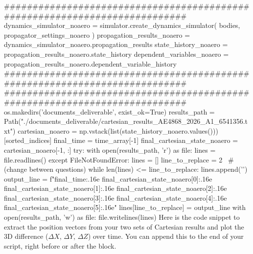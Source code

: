 {}
\markdownRendererSectionEnd \markdownRendererSectionBegin
{}\markdownRendererInterblockSeparator
{}###########################################################################\markdownRendererInterblockSeparator
{}
\markdownRendererSectionEnd \markdownRendererSectionBegin
{}\markdownRendererInterblockSeparator
{}dynamics_simulator_noaero = simulator.create_dynamics_simulator( bodies, propagator_settings_noaero )\markdownRendererInterblockSeparator
{}
\markdownRendererSectionEnd \markdownRendererSectionBegin
{}\markdownRendererInterblockSeparator
{}propagation_results_noaero = dynamics_simulator_noaero.propagation_results\markdownRendererInterblockSeparator
{}
\markdownRendererSectionEnd \markdownRendererSectionBegin
{}\markdownRendererInterblockSeparator
{}state_history_noaero = propagation_results_noaero.state_history dependent_variables_noaero = propagation_results_noaero.dependent_variable_history\markdownRendererInterblockSeparator
{}###########################################################################\markdownRendererInterblockSeparator
{}
\markdownRendererSectionEnd \markdownRendererSectionBegin
{}\markdownRendererInterblockSeparator
{}########################################################################### os.makedirs('documents_deliverable', exist_ok=True) results_path = Path("./documents_deliverable/cartesian_results_AE4868_2026_A1_6541356.txt") cartesian_noaero = np.vstack(list(state_history_noaero.values()))[sorted_indices] final_time = time_array[-1] final_cartesian_state_noaero = cartesian_noaero[-1, :] try: with open(results_path, 'r') as file: lines = file.readlines() except FileNotFoundError: lines = [] line_to_replace = 2  # (change between questions) while len(lines) <= line_to_replace: lines.append('\n') output_line = f"{final_time:.16e} {final_cartesian_state_noaero[0]:.16e} {final_cartesian_state_noaero[1]:.16e} {final_cartesian_state_noaero[2]:.16e} {final_cartesian_state_noaero[3]:.16e} {final_cartesian_state_noaero[4]:.16e} {final_cartesian_state_noaero[5]:.16e}\n" lines[line_to_replace] = output_line with open(results_path, 'w') as file: file.writelines(lines)\markdownRendererInterblockSeparator
{}\markdownRendererSectionBegin
{}\markdownRendererInterblockSeparator
{}Here is the code snippet to extract the position vectors from your two sets of Cartesian results and plot the 3D difference ($\Delta X$, $\Delta Y$, $\Delta Z$) over time. You can append this to the end of your script, right before or after the  block.\markdownRendererInterblockSeparator
